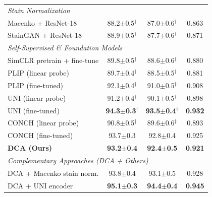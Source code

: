 \begin{table}[t]
\begin{tabularx}{\textwidth}{Xccc}
\hline
\multicolumn{4}{l}{\textit{Stain Normalization}} \\
Macenko + ResNet-18 & 88.2$\pm$0.5$^\ddagger$ & 87.0$\pm$0.6$^\ddagger$ & 0.863 \\
StainGAN + ResNet-18 & 88.9$\pm$0.5$^\ddagger$ & 87.7$\pm$0.6$^\ddagger$ & 0.871 \\
\hline
\multicolumn{4}{l}{\textit{Self-Supervised \& Foundation Models}} \\
SimCLR pretrain + fine-tune & 89.8$\pm$0.5$^\ddagger$ & 88.6$\pm$0.6$^\ddagger$ & 0.880 \\
PLIP (linear probe) & 89.7$\pm$0.4$^\ddagger$ & 88.5$\pm$0.5$^\ddagger$ & 0.881 \\
PLIP (fine-tuned) & 92.1$\pm$0.4$^\dagger$ & 91.0$\pm$0.5$^\dagger$ & 0.908 \\
UNI (linear probe) & 91.2$\pm$0.4$^\ddagger$ & 90.1$\pm$0.5$^\ddagger$ & 0.898 \\
UNI (fine-tuned) & \textbf{94.3$\pm$0.3}$^\dagger$ & \textbf{93.5$\pm$0.4}$^\dagger$ & \textbf{0.932} \\
CONCH (linear probe) & 90.8$\pm$0.5$^\ddagger$ & 89.6$\pm$0.6$^\ddagger$ & 0.893 \\
CONCH (fine-tuned) & 93.7$\pm$0.3 & 92.8$\pm$0.4 & 0.925 \\
\hline
\textbf{DCA (Ours)} & \textbf{93.2$\pm$0.4} & \textbf{92.4$\pm$0.5} & \textbf{0.921} \\
\hline
\multicolumn{4}{l}{\textit{Complementary Approaches (DCA + Others)}} \\
DCA + Macenko stain norm. & 93.8$\pm$0.4 & 93.1$\pm$0.5 & 0.928 \\
DCA + UNI encoder & \textbf{95.1$\pm$0.3} & \textbf{94.4$\pm$0.4} & \textbf{0.945} \\
\hline
\end{tabularx}
\end{table}

